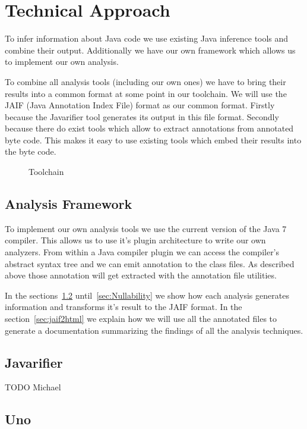 \section{Technical Approach}
To infer information about Java code we use existing Java inference tools and 
combine their output. Additionally we have our own framework which allows us to
implement our own analysis. 

To combine all analysis tools (including our own ones) we have to bring 
their results into a common format at some point in our toolchain. 
We will use the JAIF (Java Annotation Index File) format as our common format. 
Firstly because the Javarifier tool generates its output in this file format. 
Secondly because there do exist tools which allow to extract annotations from 
annotated byte code. This makes it easy to use existing tools which embed their 
results into the byte code.

\begin{figure}
\centering
{}
\caption{Toolchain}
\label{fig:toolchain}
\end{figure}

\subsection{Analysis Framework}
\label{ss:analysisFramework}

To implement our own analysis tools we use the current version of the Java 7 compiler.
This allows us to use it's plugin architecture to write our own analyzers. From within
a Java compiler plugin we can access the compiler's abstract syntax tree and we can emit 
annotation to the class files. As described above those annotation will get extracted 
with the annotation file utilities.

In the sections~\ref{sec:Javarifier} until~\ref{sec:Nullability} we show how each analysis 
generates information and transforms it's result to the JAIF format. In the section~\ref{sec:jaif2html}
we explain how we will use all the annotated files to generate a documentation summarizing
the findings of all the analysis techniques.

\subsection{Javarifier}
\label{sec:Javarifier}
TODO Michael


\subsection{Uno}

